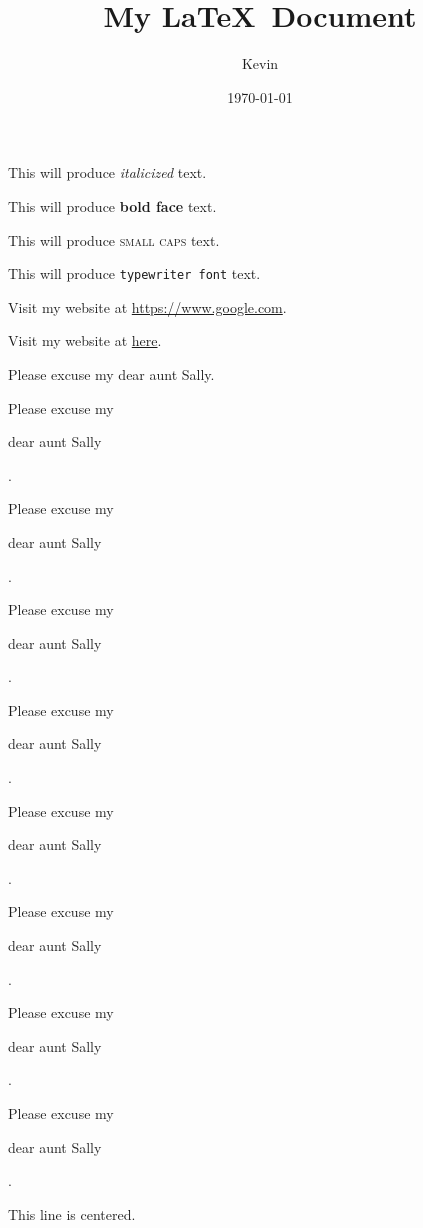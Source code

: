 \documentclass[12pt]{article}
\title{My \LaTeX\ Document}
\author{Kevin}
\date{\today}
\begin{document}
\tableofcontents
\maketitle

This will produce \textit{italicized} text.

This will produce \textbf{bold face} text.

This will produce \textsc{small caps} text.

This will produce \texttt{typewriter font} text.

Visit my website at \url{https://www.google.com}.

Visit my website at \href{https://www.google.com}{here}.

\vspace{1cm}

Please excuse my dear aunt Sally.

Please excuse my \begin{large}dear aunt Sally\end{large}.

Please excuse my \begin{Large}dear aunt Sally\end{Large}.

Please excuse my \begin{huge}dear aunt Sally\end{huge}.

Please excuse my \begin{Huge}dear aunt Sally\end{Huge}.

Please excuse my \begin{normalsize}dear aunt Sally\end{normalsize}.

Please excuse my \begin{small}dear aunt Sally\end{small}.

Please excuse my \begin{scriptsize}dear aunt Sally\end{scriptsize}.

Please excuse my \begin{tiny}dear aunt Sally\end{tiny}.

\vspace{1cm}

\begin{center}This line is centered.\end{center}
\end{document}
